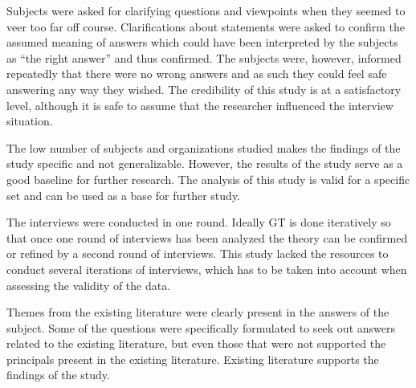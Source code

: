 Subjects were asked for clarifying questions and viewpoints when they seemed to veer too far off course. Clarifications about statements were asked to confirm the assumed meaning of answers which could have been interpreted by the subjects as ``the right answer'' and thus confirmed. The subjects were, however, informed repeatedly that there were no wrong answers and as such they could feel safe answering any way they wished. The credibility of this study is at a satisfactory level, although it is safe to assume that the researcher influenced the interview situation.


The low number of subjects and organizations studied makes the findings of the study specific and not generalizable. However, the results of the study serve as a good baseline for further research. The analysis of this study is valid for a specific set and can be used as a base for further study.

The interviews were conducted in one round. Ideally GT is done iteratively so that once one round of interviews has been analyzed the theory can be confirmed or refined by a second round of interviews. This study lacked the resources to conduct several iterations of interviews, which has to be taken into account when assessing the validity of the data.

Themes from the existing literature were clearly present in the answers of the subject. Some of the questions were specifically formulated to seek out answers related to the existing literature, but even those that were not supported the principals present in the existing literature. Existing literature supports the findings of the study.

